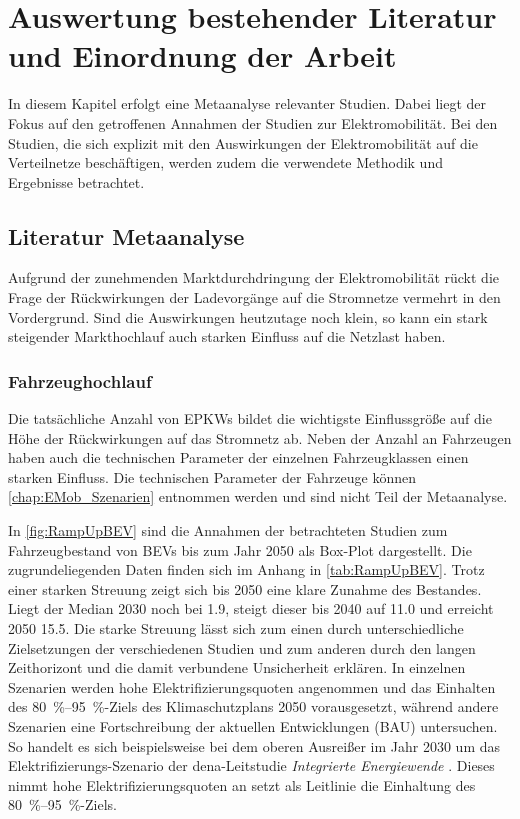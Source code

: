 
\section{Auswertung bestehender Literatur und Einordnung der Arbeit}\label{chap:Literatur}

In diesem Kapitel erfolgt eine Metaanalyse relevanter Studien.
Dabei liegt der Fokus auf den getroffenen Annahmen der Studien zur Elektromobilität.
Bei den Studien, die sich explizit mit den Auswirkungen der Elektromobilität auf die Verteilnetze beschäftigen, werden zudem die verwendete Methodik und Ergebnisse betrachtet.


\subsection{Literatur Metaanalyse}\label{chap:Metaanalyse}

Aufgrund der zunehmenden Marktdurchdringung der Elektromobilität rückt die Frage der Rückwirkungen der Ladevorgänge auf die Stromnetze vermehrt in den Vordergrund.
Sind die Auswirkungen heutzutage noch klein, so kann ein stark steigender Markthochlauf auch starken Einfluss auf die Netzlast haben.


\subsubsection{Fahrzeughochlauf}

Die tatsächliche Anzahl von \glspl{EPKW} bildet die wichtigste Einflussgröße auf die Höhe der Rückwirkungen auf das Stromnetz ab.
Neben der Anzahl an Fahrzeugen haben auch die technischen Parameter der einzelnen Fahrzeugklassen einen starken Einfluss.
Die technischen Parameter der Fahrzeuge können \autoref{chap:EMob_Szenarien} entnommen werden und sind nicht Teil der Metaanalyse.



In \autoref{fig:RampUpBEV} sind die Annahmen der betrachteten Studien zum Fahrzeugbestand von \glspl{BEV} bis zum Jahr \num{2050} als Box-Plot dargestellt.
Die zugrundeliegenden Daten finden sich im Anhang in \autoref{tab:RampUpBEV}.
Trotz einer starken Streuung zeigt sich bis \num{2050} eine klare Zunahme des Bestandes.
Liegt der Median 2030 noch bei \SI{1.9}{\MioStk}, steigt dieser bis \num{2040} auf \SI{11.0}{\Mio} und erreicht \num{2050} \SI{15.5}{\Mio}.
Die starke Streuung lässt sich zum einen durch unterschiedliche Zielsetzungen der verschiedenen Studien und zum anderen durch den langen Zeithorizont und die damit verbundene Unsicherheit erklären.
In einzelnen Szenarien werden hohe Elektrifizierungsquoten angenommen und das Einhalten des \SIrange[range-phrase=~{--}~]{80}{95}{\percent}-Ziels des Klimaschutzplans \num{2050} vorausgesetzt, während andere Szenarien eine Fortschreibung der aktuellen Entwicklungen (\gls{BAU}) untersuchen.
So handelt es sich beispielsweise bei dem oberen Ausreißer im Jahr 2030 um das Elektrifizierungs-Szenario der dena-Leitstudie \textit{Integrierte Energiewende} \cite{DEAGH2018}.
Dieses nimmt hohe Elektrifizierungsquoten an setzt als Leitlinie die Einhaltung des \SIrange[range-phrase=~{--}~]{80}{95}{\percent}-Ziels.\medskip

